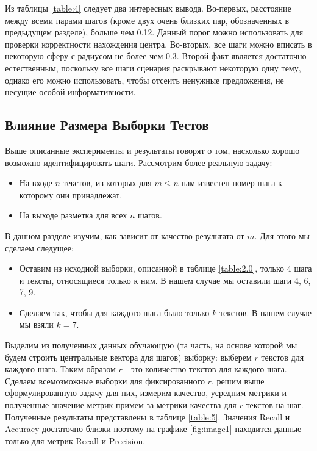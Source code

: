 \documentclass[12pt]{article}
\begin{document}
Из таблицы \ref{table:4} следует два интересных вывода. Во-первых, расстояние между всеми парами шагов (кроме двух очень близких пар, обозначенных в предыдущем разделе), больше чем 0.12. Данный порог можно использовать для проверки корректности нахождения центра. Во-вторых, все шаги можно вписать в некоторую сферу с радиусом не более чем 0.3. Второй факт является достаточно естественным, поскольку все шаги сценария раскрывают некоторую одну тему, однако его можно использовать, чтобы отсеить ненужные предложения, не несущие особой информативности.

\subsection{Влияние Размера Выборки Тестов}

Выше описанные эксперименты и результаты говорят о том, насколько хорошо возможно идентифицировать шаги. Рассмотрим более реальную задачу:

\begin{itemize}
	\item На входе $n$ текстов, из которых для $m\leq n$ нам известен номер шага к которому они принадлежат.
	\item На выходе разметка для всех $n$ шагов.
\end{itemize}

В данном разделе изучим, как зависит от качество результата от $m$. Для этого мы сделаем следущее:
\begin{itemize}
	\item Оставим из исходной выборки, описанной в таблице \ref{table:2.0}, только 4 шага и тексты, относящиеся только к ним. В нашем случае мы оставили шаги 4, 6, 7, 9.
	\item Сделаем так, чтобы для каждого шага было только $k$ текстов. В нашем случае мы взяли $k=7$.
\end{itemize}
Выделим из полученных данных обучающую (та часть, на основе которой мы будем строить центральные вектора для шагов) выборку: выберем $r$ текстов для каждого шага. Таким образом $r$ - это количество текстов для каждого шага. Сделаем всемозможные выборки для фиксированного $r$, решим выше сформулированную задачу для них, измерим качество, усредним метрики и полученные значение метрик примем за метрики качества для $r$ текстов на шаг. Полученные результаты представлены в таблице \ref{table:5}. Значения Recall и Accuracy достаточно близки поэтому на графике \ref{fig:image1} находится данные только для метрик Recall и Precision.
\end{document}
